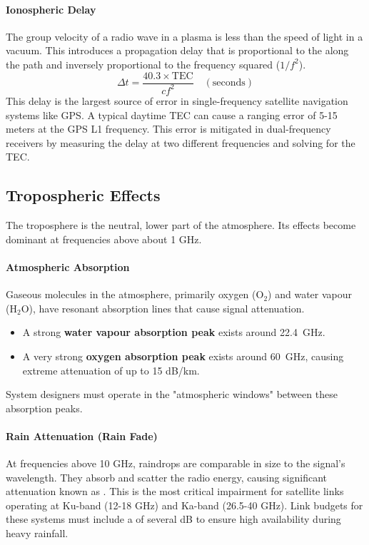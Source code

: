 \paragraph{Ionospheric Delay}
The group velocity of a radio wave in a plasma is less than the speed of light in a vacuum. This introduces a propagation delay that is proportional to the  along the path and inversely proportional to the frequency squared ($1/f^2$).
\begin{equation}
    \Delta t = \frac{40.3 \times \text{TEC}}{c f^2} \quad (\text{seconds})
\end{equation}
This delay is the largest source of error in single-frequency satellite navigation systems like GPS. A typical daytime TEC can cause a ranging error of 5-15 meters at the GPS L1 frequency. This error is mitigated in dual-frequency receivers by measuring the delay at two different frequencies and solving for the TEC.


\subsection{Tropospheric Effects}

The troposphere is the neutral, lower part of the atmosphere. Its effects become dominant at frequencies above about 1 GHz.

\paragraph{Atmospheric Absorption}
Gaseous molecules in the atmosphere, primarily oxygen (O$_2$) and water vapour (H$_2$O), have resonant absorption lines that cause signal attenuation.
\begin{itemize}
    \item A strong \textbf{water vapour absorption peak} exists around \qty{22.4}{GHz}.
    \item A very strong \textbf{oxygen absorption peak} exists around \qty{60}{GHz}, causing extreme attenuation of up to 15 dB/km.
\end{itemize}
System designers must operate in the "atmospheric windows" between these absorption peaks.

\paragraph{Rain Attenuation (Rain Fade)}
At frequencies above 10 GHz, raindrops are comparable in size to the signal's wavelength. They absorb and scatter the radio energy, causing significant attenuation known as . This is the most critical impairment for satellite links operating at Ku-band (12-18 GHz) and Ka-band (26.5-40 GHz). Link budgets for these systems must include a  of several dB to ensure high availability during heavy rainfall.

